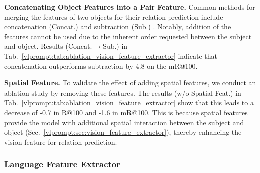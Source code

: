 \noindent \textbf{Concatenating Object Features into a Pair Feature.}
Common methods for merging the features of two objects for their relation prediction include concatenation (Concat.) \citep{zhang2019graphical} and subtraction (Sub.) \citep{cheng2022visual}.
Notably, addition of the features cannot be used due to the inherent order requested between the subject and object.
Results (Concat.$\rightarrow$Sub.) in Tab.~\ref{vlprompt:tab:ablation_vision_feature_extractor} indicate that concatenation outperforms subtraction by 4.8 on the mR@100.

\noindent \textbf{Spatial Feature.}
To validate the effect of adding spatial features, we conduct an ablation study by removing these features.
The results (w/o Spatial Feat.) in Tab.~\ref{vlprompt:tab:ablation_vision_feature_extractor} show that this leads to a decrease of -0.7 in R@100 and -1.6 in mR@100.
This is because spatial features provide the model with additional spatial interaction between the subject and object (Sec.~\ref{vlprompt:sec:vision_feature_extractor}), thereby enhancing the vision feature for relation prediction.


\subsubsection{Language Feature Extractor}

\begin{table}[!t]
    \centering
    \setlength{\tabcolsep}{2.8mm}
    \caption{Ablation study for the Language Feature Extractor.}
    \label{vlprompt:tab:ablation_language_feature_extractor}
\end{table}

